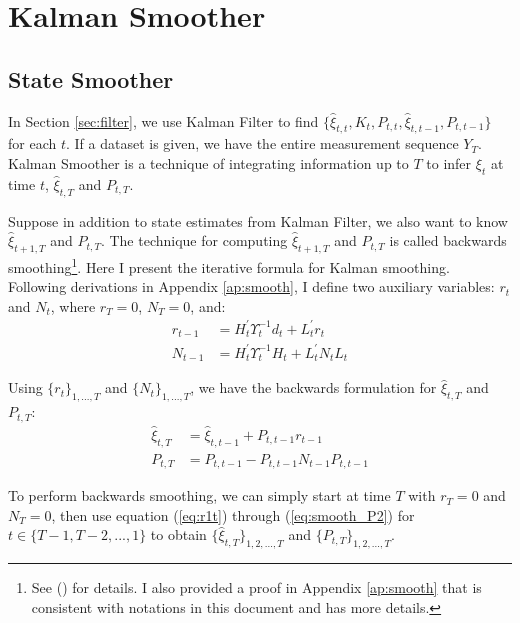 \documentclass[12pt]{article}
\numberwithin{equation}{section}
\begin{document}
\section{Kalman Smoother} \label{sec:smoother}
\subsection{State Smoother}
In Section \ref{sec:filter}, we use Kalman Filter to find $\{\hat{\xi}_{t,t}, K_t, P_{t,t}, \hat{\xi}_{t,t-1}, P_{t,t-1}\}$ for each $t$. If a dataset is given, we have the entire measurement sequence $Y_T$. Kalman Smoother is a technique of integrating information up to $T$ to infer $\xi_t$ at time $t$, $\hat{\xi}_{t,T}$ and $P_{t,T}$. 

Suppose in addition to state estimates from Kalman Filter, we also want to know $\hat{\xi}_{t+1,T}$ and $P_{t,T}$. The technique for computing $\hat{\xi}_{t+1,T}$ and $P_{t,T}$ is called backwards smoothing\footnote{See (\cite{dejong_1989}) for details. I also provided a proof in Appendix \ref{ap:smooth} that is consistent with notations in this document and has more details.}. Here I present the iterative formula for Kalman smoothing. Following derivations in Appendix \ref{ap:smooth}, I define two auxiliary variables: $r_{t}$ and $N_{t}$, where $r_T=0$, $N_T=0$, and:
\begin{align}
    r_{t-1} &= H_t^{'}\Upsilon_t^{-1}d_t + L_t^{'}r_t \label{eq:r1t} \\
    N_{t-1} &= H_t^{'}\Upsilon_t^{-1}H_t + L_t^{'}N_tL_t \label{eq:N1t}
\end{align}

Using $\{r_t\}_{1,...,T}$ and $\{N_t\}_{1,...,T}$, we have the backwards formulation for $\hat{\xi}_{t,T}$ and $P_{t,T}$:
\begin{align}
    \hat{\xi}_{t,T} &= \hat{\xi}_{t,t-1} + P_{t,t-1}r_{t-1} \label{eq:smooth_state2} \\
    P_{t,T} &= P_{t,t-1}- P_{t,t-1}N_{t-1}P_{t,t-1} \label{eq:smooth_P2}
\end{align}

To perform backwards smoothing, we can simply start at time $T$ with $r_T=0$ and $N_T=0$, then use equation (\ref{eq:r1t}) through (\ref{eq:smooth_P2}) for $t\in\{T-1,T-2,...,1\}$ to obtain $\{\hat{\xi}_{t,T}\}_{1,2,...,T}$ and $\{P_{t,T}\}_{1,2,...,T}$.
\end{document}

